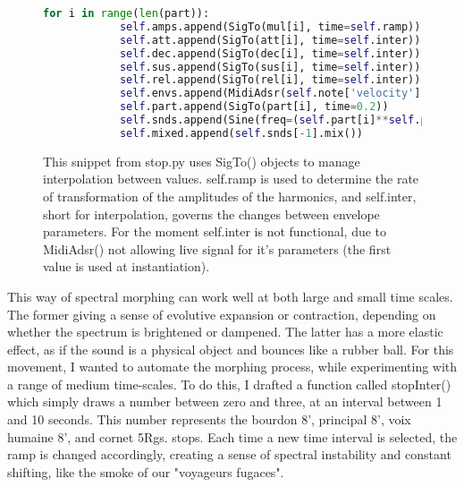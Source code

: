 \documentclass[12pt,twoside,maitrise]{dms}
\theoremstyle{definition}
\begin{document}
\begin{figure}[H]
\begin{lstlisting}[language=Python]
        for i in range(len(part)):
            self.amps.append(SigTo(mul[i], time=self.ramp))
            self.att.append(SigTo(att[i], time=self.inter))
            self.dec.append(SigTo(dec[i], time=self.inter))
            self.sus.append(SigTo(sus[i], time=self.inter))
            self.rel.append(SigTo(rel[i], time=self.inter))
            self.envs.append(MidiAdsr(self.note['velocity'], attack=att[i], decay=dec[i], sustain=sus[i], release=rel[i], mul=self.amps[-1]))
            self.part.append(SigTo(part[i], time=0.2))
            self.snds.append(Sine(freq=(self.part[i]**self.partSc) * (MToF(FToM(self.note['pitch']-0.15))) + Randi(-rand, rand, 5) + self.trans + self.mod, mul=self.envs[-1]))
            self.mixed.append(self.snds[-1].mix())
\end{lstlisting}
\caption{This snippet from stop.py uses SigTo() objects to manage interpolation between values.
self.ramp is used to determine the rate of transformation of the amplitudes of the harmonics, and self.inter, short for interpolation, governs the changes between envelope parameters.
For the moment self.inter is not functional, due to MidiAdsr() not allowing live signal for it's parameters (the first value is used at instantiation).} 
\end{figure}

This way of spectral morphing can work well at both large and small time scales.
The former giving a sense of evolutive expansion or contraction, depending on whether the spectrum is brightened or dampened.
The latter has a more elastic effect, as if the sound is a physical object and bounces like a rubber ball.
For this movement, I wanted to automate the morphing process, while experimenting with a range of medium time-scales.
To do this, I drafted a function called stopInter() which simply draws a number between zero and three, at an interval between 1 and 10 seconds.
This number represents the bourdon 8', principal 8', voix humaine 8', and cornet 5Rgs.
stops.
Each time a new time interval is selected, the ramp is changed accordingly, creating a sense of spectral instability and constant shifting, like the smoke of our "voyageurs fugaces".
\end{document}
